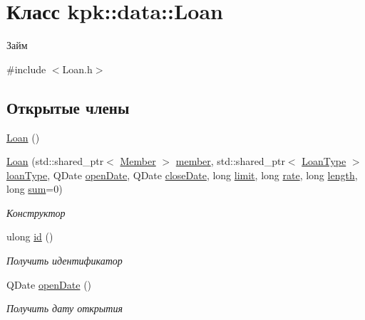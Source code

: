 \hypertarget{classkpk_1_1data_1_1_loan}{}\section{Класс kpk\+:\+:data\+:\+:Loan}
\label{classkpk_1_1data_1_1_loan}


Займ  




{\ttfamily \#include $<$Loan.\+h$>$}

\subsection*{Открытые члены}
\begin{DoxyCompactItemize}
\item 
\hyperlink{classkpk_1_1data_1_1_loan_a466384959c1ccfaf4942c96c3409e6e6}{Loan} ()
\item 
\hyperlink{classkpk_1_1data_1_1_loan_afe8d8c50d04caef057413f2739599c82}{Loan} (std\+::shared\+\_\+ptr$<$ \hyperlink{classkpk_1_1data_1_1_member}{Member} $>$ \hyperlink{classkpk_1_1data_1_1_loan_a37fb3cc07280aa8310a32b4477b5528f}{member}, std\+::shared\+\_\+ptr$<$ \hyperlink{classkpk_1_1data_1_1_loan_type}{Loan\+Type} $>$ \hyperlink{classkpk_1_1data_1_1_loan_a791850364c82ef161f09669c64bcc2a3}{loan\+Type}, Q\+Date \hyperlink{classkpk_1_1data_1_1_loan_a0b039c0e6667da4f809f8e921f359f9b}{open\+Date}, Q\+Date \hyperlink{classkpk_1_1data_1_1_loan_af8ccbb954480eae0aa3b2a6b2f39fcb5}{close\+Date}, long \hyperlink{classkpk_1_1data_1_1_loan_ae82f80aa7a9b58fdfb2ac818dd33611d}{limit}, long \hyperlink{classkpk_1_1data_1_1_loan_affb2d1a39a5c7c185b07d5f6de87a43e}{rate}, long \hyperlink{classkpk_1_1data_1_1_loan_a89c1fd9e63d8923796f0cb3452bafa27}{length}, long \hyperlink{classkpk_1_1data_1_1_loan_a5b207380d82a2079ea83ec1ecf11f090}{sum}=0)
\begin{DoxyCompactList}\small\item\em Конструктор \end{DoxyCompactList}\item 
ulong \hyperlink{classkpk_1_1data_1_1_loan_a2827052c65d91b314bf1573ab56ffa3d}{id} ()
\begin{DoxyCompactList}\small\item\em Получить идентификатор \end{DoxyCompactList}\item 
Q\+Date \hyperlink{classkpk_1_1data_1_1_loan_a0b039c0e6667da4f809f8e921f359f9b}{open\+Date} ()
\begin{DoxyCompactList}\small\item\em Получить дату открытия \end{DoxyCompactList}\item 

\end{DoxyCompactItemize}
